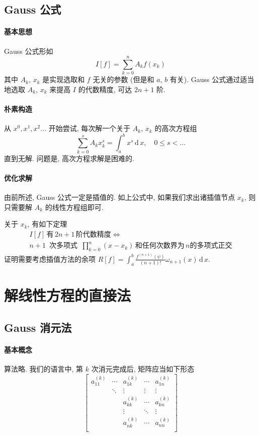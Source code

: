 \documentclass{ctexart}
\newcommand{\ud}{\,\mathrm{d}\,}
\begin{document}
\subsection{Gauss 公式}
\paragraph{基本思想}
    Gauss 公式形如 \[
        I[f] = \sum_{k=0}^n A_k f(x_k)\]
    其中 $A_k$, $x_k$ 是实现选取和 $f$ 无关的参数 (但是和 $a$, $b$ 有关).
    Gauss 公式通过适当地选取 $A_k$, $x_k$ 来提高 $I$ 的代数精度, 可达 $2n + 1$ 阶.
\paragraph{朴素构造}
    从 $x^0, x^1, x^2 \ldots$ 开始尝试, 每次解一个关于 $A_k$, $x_k$ 的高次方程组 \[
        \sum_{k=0}^s A_k x_k^s = \int_a^b x^s \ud x,\quad 0 \le s < \ldots \]
    直到无解. 问题是, 高次方程求解是困难的.
\paragraph{优化求解}
    由前所述, Gauss 公式一定是插值的.
    如上公式中, 如果我们求出诸插值节点 $x_k$, 则只需要解 $A_k$ 的线性方程组即可.\par
    关于 $x_k$, 有如下定理 \begin{multline*}
        I[f]\,\text{有}\,2n + 1\,\text{阶代数精度} \Leftrightarrow\\
        n+1\,\text{ 次多项式 }\,\prod_{k=0}^n (x-x_k)\,\text{和任何次数界为}\,n\text{的多项式正交}
    \end{multline*}
    证明需要考虑插值方法的余项 $R[f] = \int_a^b \frac{f^{(n+1)}(\psi)}{(n+1)!} \omega_{n+1}(x) \ud x$.
    
\section{解线性方程的直接法}
\subsection{Gauss 消元法}
\paragraph{基本概念}
    算法略. 我们的语言中, 第 $k$ 次消元完成后, 矩阵应当如下形态 \[
        \begin{bmatrix}
            a^{(k)}_{11} & \cdots & a^{(k)}_{1k}  & \cdots & a^{(k)}_{1n} \\
                         & \ddots & \vdots        & \vdots & \vdots              \\
                         &        & a^{(k)}_{k k} & \cdots & a^{(k)}_{kn}        \\
                         &        & \vdots        & \ddots & \vdots              \\
                         &        & a^{(k)}_{n k} & \cdots & a^{(k)}_{nn}        \\
        \end{bmatrix}\]
\end{document}
